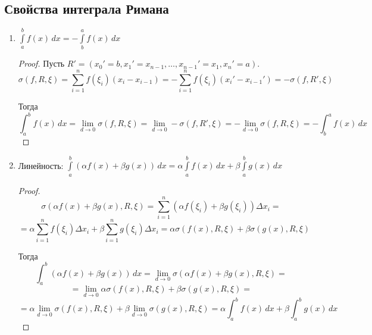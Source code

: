 \subsection{Свойства интеграла Римана}
\begin{enumerate}
	\item \label{st:b_a_integral} $\int\limits_a^b f(x)\,dx = -\int\limits_b^a f(x)\,dx$
	\begin{proof}
	Пусть $R' = (x_0' = b, x_1' = x_{n-1}, \ldots, x_{n-1}' = x_1, x_n' = a)$.
	\begin{equation*}
	\sigma(f, R, \xi) =
	\sum_{i=1}^n f(\xi_i) (x_i - x_{i-1}) =
	-\sum_{i=1}^n f(\xi_i) (x_i' - x_{i-1}') =
	-\sigma(f, R', \xi)
	\end{equation*}
	
	Тогда
	\begin{equation*}
	\int_a^b f(x)\,dx =
	\lim_{d \to 0} \sigma(f, R, \xi) =
	\lim_{d \to 0} -\sigma(f, R', \xi) =
	-\lim_{d \to 0} \sigma(f, R, \xi) =
	-\int_b^a f(x)\,dx
	\end{equation*}
	\end{proof}
	
	\item Линейность: $\int\limits_a^b (\alpha f(x) + \beta g(x))\,dx = 
	\alpha \int\limits_a^b f(x)\,dx + \beta \int\limits_a^b g(x)\,dx$
	\begin{proof}
	\begin{equation*}
	\sigma(\alpha f(x) + \beta g(x), R, \xi) =
	\sum_{i=1}^n (\alpha f(\xi_i) + \beta g(\xi_i)) \Delta x_i =
	\end{equation*}
	\begin{equation*}
	= \alpha \sum_{i=1}^n f(\xi_i) \Delta x_i + \beta \sum_{i=1}^n g(\xi_i) \Delta x_i =
	\alpha \sigma(f(x), R, \xi) + \beta \sigma(g(x), R, \xi)
	\end{equation*}
	
	Тогда
	\begin{equation*}
	\int_a^b (\alpha f(x) + \beta g(x))\,dx =
	\lim_{d \to 0} \sigma(\alpha f(x) + \beta g(x), R, \xi) =
	\end{equation*}
	\begin{equation*}
	= \lim_{d \to 0} \alpha \sigma(f(x), R, \xi) + \beta \sigma(g(x), R, \xi) =
	\end{equation*}
	\begin{equation*}
	= \alpha \lim_{d \to 0} \sigma(f(x), R, \xi) + \beta \lim_{d \to 0} \sigma(g(x), R, \xi) =
	\alpha \int_a^b f(x)\,dx + \beta \int_a^b g(x)\,dx
	\end{equation*}
	\end{proof}
	

\end{enumerate}

